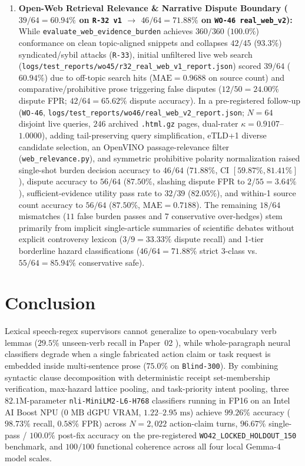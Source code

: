 \documentclass[11pt,a4paper]{article}
\begin{document}
\begin{enumerate}
    \item \textbf{Open-Web Retrieval Relevance \& Narrative Dispute Boundary ($39/64 = 60.94\%$ on \texttt{R-32 v1} $\to$ $46/64 = 71.88\%$ on \texttt{WO-46 real\_web\_v2}):} While \texttt{evaluate\_web\_evidence\_burden} achieves $360/360$ ($100.0\%$) conformance on clean topic-aligned snippets and collapses $42/45$ ($93.3\%$) syndicated/sybil attacks (\texttt{R-33}), initial unfiltered live web search (\texttt{logs/test\_reports/wo45/r32\_real\_web\_v1\_report.json}) scored $39/64$ ($60.94\%$) due to off-topic search hits ($\text{MAE} = 0.9688$ on source count) and comparative/prohibitive prose triggering false disputes ($12/50 = 24.00\%$ dispute FPR; $42/64 = 65.62\%$ dispute accuracy). In a pre-registered follow-up (\texttt{WO-46}, \texttt{logs/test\_reports/wo46/real\_web\_v2\_report.json}; $N=64$ disjoint live queries, $246$ archived \texttt{.html.gz} pages, dual-rater $\kappa = 0.9107$--$1.0000$), adding tail-preserving query simplification, eTLD+1 diverse candidate selection, an OpenVINO passage-relevance filter (\texttt{web\_relevance.py}), and symmetric prohibitive polarity normalization raised single-shot burden decision accuracy to $46/64$ ($71.88\%$, CI $[59.87\%, 81.41\%]$), dispute accuracy to $56/64$ ($87.50\%$, slashing dispute FPR to $2/55 = 3.64\%$), sufficient-evidence utility pass rate to $32/39$ ($82.05\%$), and within-1 source count accuracy to $56/64$ ($87.50\%$, $\text{MAE} = 0.7188$). The remaining $18/64$ mismatches ($11$ false burden passes and $7$ conservative over-hedges) stem primarily from implicit single-article summaries of scientific debates without explicit controversy lexicon ($3/9 = 33.33\%$ dispute recall) and 1-tier borderline hazard classifications ($46/64 = 71.88\%$ strict 3-class vs.\ $55/64 = 85.94\%$ conservative safe).
\end{enumerate}

\section{Conclusion}
\label{sec:conclusion}
Lexical speech-regex supervisors cannot generalize to open-vocabulary verb lemmas ($29.5\%$ unseen-verb recall in Paper~02 \cite{maxwell2026evasion}), while whole-paragraph neural classifiers degrade when a single fabricated action claim or task request is embedded inside multi-sentence prose ($75.0\%$ on \texttt{Blind-300}). By combining syntactic clause decomposition with deterministic receipt set-membership verification, max-hazard lattice pooling, and task-priority intent pooling, three $82.1\text{M}$-parameter \texttt{nli-MiniLM2-L6-H768} classifiers running in FP16 on an Intel AI Boost NPU ($0\text{ MB}$ dGPU VRAM, $1.22$--$2.95\text{ ms}$) achieve $99.26\%$ accuracy ($98.73\%$ recall, $0.58\%$ FPR) across $N=2{,}022$ action-claim turns, $96.67\%$ single-pass / $100.0\%$ post-fix accuracy on the pre-registered \texttt{WO42\_LOCKED\_HOLDOUT\_150} benchmark, and $100/100$ functional coherence across all four local Gemma-4 model scales.
\end{document}
